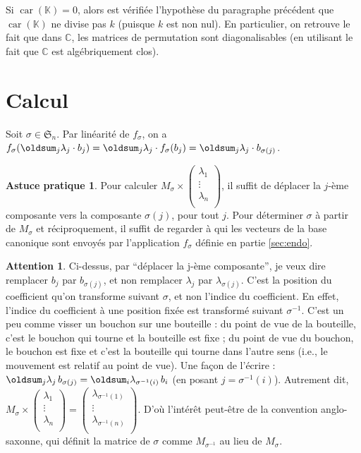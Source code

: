 \documentclass[10pt,a4paper,french,landscape]{article}
\DeclarePairedDelimiter\parenlong{\lparen}{\rparen}
\newcommand{\paren}[1]{\parenlong*{#1}}
\renewcommand{\sum}{\displaystyle\oldsum}
\theoremstyle{definition}
\newtheorem*{as}{Astuce pratique}
\newtheorem*{att}{Attention}
\theoremstyle{remark}
\DeclareMathOperator{\car}{car}
\newcommand{\CC}{\mathbb C}
\newcommand{\KK}{\mathbb K}
\newcommand{\Sy}{\mathfrak{S}}
\newcommand{\1}{\mathbbm{1}}
\newcommand{\Sn}[1][n]{\Sy_{#1}}
\begin{document}
\begin{multicols*}{2}
Si $\car(\KK)=0$, alors est vérifiée l'hypothèse du paragraphe précédent que $\car(\KK)$ ne divise pas $k$ (puisque $k$ est non nul). En particulier, on retrouve le fait que dans $\CC$, les matrices de permutation sont diagonalisables (en utilisant le fait que $\CC$ est algébriquement clos).

\section{Calcul}
\label{sec:calcul}

\noindent
Soit $\sigma\in\Sn$. Par linéarité de $f_\sigma$, on a \quad
$f_\sigma\paren{\sum_j \lambda_j\cdot b_j} = \sum_j \lambda_j\cdot f_\sigma\paren{b_j} = \sum_j \lambda_j\cdot b_{\sigma(j)}$.

\begin{as}
Pour calculer $M_\sigma\times
\begin{pmatrix}
	\lambda_1 \\
	\vdots \\
	\lambda_n \\
\end{pmatrix}$, il suffit de déplacer la $j$-ème composante vers la composante $\sigma(j)$, pour tout $j$. Pour déterminer $\sigma$ à partir de $M_\sigma$ et réciproquement, il suffit de regarder à qui les vecteurs de la base canonique sont envoyés par l'application $f_\sigma$ définie en partie \ref{sec:endo}.
\end{as}

\begin{att}
Ci-dessus, par ``déplacer la j-ème composante'', je veux dire remplacer $b_j$ par $b_{\sigma(j)}$, et non remplacer $\lambda_j$ par $\lambda_{\sigma(j)}$. C'est la position du coefficient qu'on transforme suivant $\sigma$, et non l'indice du coefficient. En effet, l'indice du coefficient à une position fixée est transformé suivant $\sigma^{-1}$. C'est un peu comme visser un bouchon sur une bouteille : du point de vue de la bouteille, c'est le bouchon qui tourne et la bouteille est fixe ; du point de vue du bouchon, le bouchon est fixe et c'est la bouteille qui tourne dans l'autre sens (i.e., le mouvement est relatif au point de vue). Une façon de l'écrire :
$\sum_j \lambda_j\, b_{\sigma(j)} = \sum_i \lambda_{\sigma^{-1}(i)}\, b_i$ (en posant $j=\sigma^{-1}(i)$).
Autrement dit, 
$M_\sigma\times
\begin{pmatrix}
	\lambda_1 \\
	\vdots \\
	\lambda_n \\
\end{pmatrix}
=
\begin{pmatrix}
	\lambda_{\sigma^{-1}(1)} \\
	\vdots \\
	\lambda_{\sigma^{-1}(n)} \\
\end{pmatrix}
$. D'où l'intérêt peut-être de la convention
anglo-saxonne, qui
%
définit la matrice de $\sigma$ comme $M_{\sigma^{-1}}$ au lieu de $M_\sigma$.
\end{att}


\end{multicols*}
\end{document}
